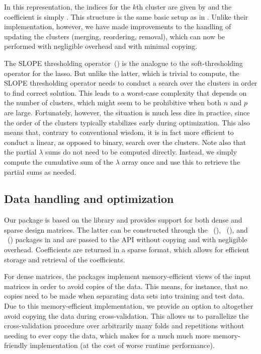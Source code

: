\documentclass[article]{jss}
\let\Cref\crtCref
\begin{document}
In this representation, the indices for the \(k\)th cluster are given by  and the coefficient is simply .
This structure is the same basic setup as in \citet{larsson2023}. Unlike
their implementation, however, we have made improvements to the
handling of updating the clusters (merging,
reordering, removal), which can now be performed with negligible
overhead and with minimal copying.

The SLOPE thresholding operator~(\Cref{fig:slope-thresholding}) is the analogue
to the soft-thresholding operator for the lasso. But unlike the latter, which
is trivial to compute, the SLOPE thresholding operator needs to conduct a
search over the clusters in order to find correct solution. This leads to a
worst-case complexity that depends on the number of clusters, which might seem
to be prohibitive when both \(n\) and \(p\) are large. Fortunately, however,
the situation is much less dire in practice, since the order of the clusters
typically stabilizes early during optimization. This also means that, contrary
to conventional wisdom, it is in fact more efficient to conduct a linear, as opposed
to binary, search over the clusters. Note also that the partial \(\lambda\) sums
do not need to be computed directly. Instead, we simply compute the
cumulative sum of the \(\lambda\) array once and use this to retrieve
the partial sums as needed.

\subsection{Data handling and optimization}

Our package is based on the   library and provides
support for both dense and sparse design matrices. The latter can be
constructed through the ~(),
~(), and ~()
packages in and are passed to the  API without copying
and with negligible overhead. Coefficients are returned in a sparse format, which
allows for efficient storage and retrieval of the coefficients.

For dense matrices, the packages implement memory-efficient views of the input
matrices in order to avoid copies of the data. This means, for instance, that
no copies need to be made when separating data sets into training and test
data. Due to this memory-efficient implementation, we provide an option to
altogether avoid copying the data during cross-validation. This allows us to
parallelize the cross-validation procedure over arbitrarily many folds and
repetitions without needing to ever copy the data, which makes for a much
much more memory-friendly implementation (at the cost of
worse runtime performance).
\end{document}
